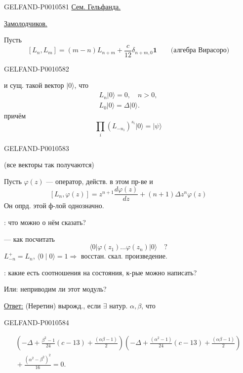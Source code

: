 \begin{GelfandAdjacentEvidence}{GELFAND-P001058}{1}
\qquad\underline{Сем. Гельфанда.}

\underline{Замолодчиков.}

Пусть
\[
[L_n,L_m]=(m-n)L_{n+m}+\frac{c}{12}\delta_{n+m,0}\mathbf1
  \qquad\text{(алгебра Вирасоро)}
\]
\end{GelfandAdjacentEvidence}
\begin{GelfandAdjacentEvidence}{GELFAND-P001058}{2}

и сущ. такой вектор \(\lvert0\rangle\), что
\begin{gather*}
L_n\lvert0\rangle=0,\quad n>0,\\
L_0\lvert0\rangle=\Delta\lvert0\rangle.
\end{gather*}
причём
\[
\prod_i(L_{-n_i})^{s_i}\lvert0\rangle=\lvert\psi\rangle
\]
\end{GelfandAdjacentEvidence}
\begin{GelfandAdjacentEvidence}{GELFAND-P001058}{3}

(все векторы так получаются)

Пусть \(\varphi(z)\) — оператор, действ. в этом пр-ве и
\[
[L_n,\varphi(z)]=z^{n+1}\frac{d\varphi(z)}{dz}+(n+1)\Delta z^n\varphi(z)
\]
Он опрд. этой ф-лой однозначно.

: что можно о нём сказать?

— как посчитать
\[
\langle0\lvert\varphi(z_1)\ldots\varphi(z_n)\rvert0\rangle\quad ?
\]
\(L_{-n}^{+}=L_n\), \(\langle0\mid0\rangle=1\Rightarrow\) восстан. скал. произведение.

: какие есть соотношения на состояния, к-рые можно написать?

Или: неприводим ли этот модуль?

\underline{Ответ:} (Неретин) вырожд., если \(\exists\) натур. \(\alpha,\beta\), что
\end{GelfandAdjacentEvidence}
\begin{GelfandAdjacentEvidence}{GELFAND-P001058}{4}

\begin{gather*}
\left(-\Delta+\frac{\beta^2-1}{24}(c-13)+\frac{(\alpha\beta-1)}{2}\right)
\left(-\Delta+\frac{(\alpha^2-1)}{24}(c-13)+\frac{(\alpha\beta-1)}{2}\right)\\
{}+\frac{(\alpha^2-\beta^2)^2}{16}=0.
\end{gather*}
\end{GelfandAdjacentEvidence}
